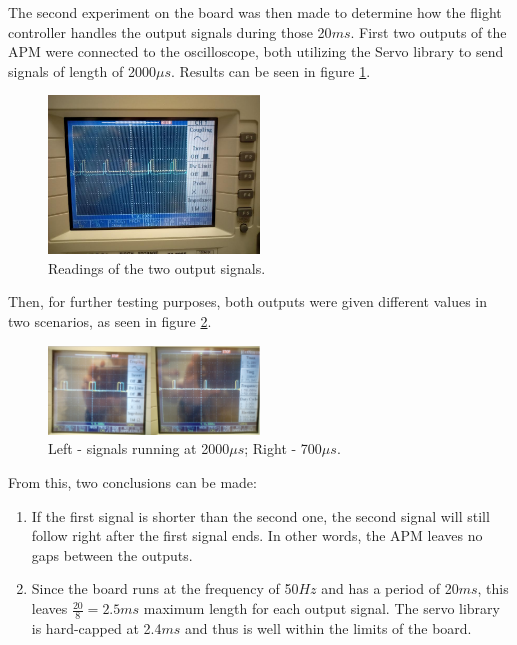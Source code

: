 The second experiment on the board was then made to determine how the flight controller handles the output signals during those 20$ms$. First two outputs of the APM were connected to the oscilloscope, both utilizing the Servo library to send signals of length of 2000$\mu s$. Results can be seen in figure \ref{oscillo2}.
\begin{figure}[H]
  \centering
    \includegraphics[width=0.5\textwidth]{images/oscillo2.jpg}
	\caption{Readings of the two output signals.}
	\label{oscillo2}
\end{figure}

Then, for further testing purposes, both outputs were given different values in two scenarios, as seen in figure \ref{oscillo3}.

\begin{figure}[H]
  \centering
    \includegraphics[width=0.5\textwidth]{images/oscillo3.png}
	\caption{Left - signals running at 2000$\mu s$; Right - 700$\mu s$.}
	\label{oscillo3}
\end{figure}

From this, two conclusions can be made:
\begin{enumerate}
\item If the first signal is shorter than the second one, the second signal will still follow right after the first signal ends. In other words, the APM leaves no gaps between the outputs.
\item Since the board runs at the frequency of 50$Hz$ and has a period of 20$ms$, this leaves $\frac{20}{8} = 2.5ms$ maximum length for each output signal. The servo library is hard-capped at 2.4$ms$ and thus is well within the limits of the board.
\end{enumerate}